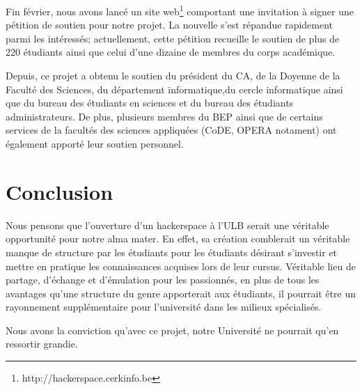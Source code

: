 \documentclass{article}
\begin{document}
Fin février, nous avons lancé un site web\footnote{http://hackerspace.cerkinfo.be} comportant
une invitation à signer une pétition de soutien pour notre projet. La nouvelle s'est répandue rapidement parmi les intéressés; actuellement, cette pétition recueille le soutien de plus de 220 étudiants ainsi que celui d'une dizaine de membres du corps académique.

Depuis, ce projet a obtenu le soutien du président du CA, de la Doyenne de la Faculté des Sciences, du département informatique,du 
cercle informatique ainsi que du bureau des étudiants en sciences et du bureau des étudiants administrateurs.
De plus, plusieurs membres du BEP ainsi que de certains services de la facultés
des sciences appliquées (CoDE, OPERA notament) ont également apporté leur soutien personnel.

\section{Conclusion}
Nous pensons que l'ouverture d'un hackerspace à l'ULB serait une véritable opportunité pour notre alma mater. En effet, sa création comblerait un véritable manque de structure par les étudiants pour les étudiants désirant s'investir et mettre en pratique les connaissances acquises lors de leur cursus. Véritable lieu de partage, d'échange et d'émulation pour les passionnés, en plus de tous les avantages qu'une structure du genre apporterait aux étudiants, il pourrait être un rayonnement supplémentaire pour l'université dans les milieux spécialisés.

Nous avons la conviction qu'avec ce projet, notre Université ne pourrait qu'en ressortir grandie.
\end{document}
